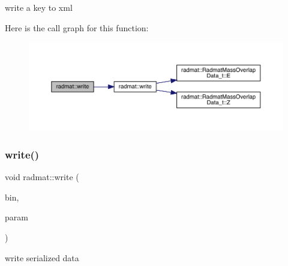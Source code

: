 write a key to xml 

Here is the call graph for this function\+:
\nopagebreak
\begin{figure}[H]
\begin{center}
\leavevmode
\includegraphics[width=350pt]{d4/d83/namespaceradmat_adaf52a8cd9ebda9a7d68fbe9f69d20a9_cgraph}
\end{center}
\end{figure}
\mbox{\label{namespaceradmat_a47d088d360c723c8981b3ef1ed8da405}} 
\subsubsection{\texorpdfstring{write()}{write()}\hspace{0.1cm}{\footnotesize\ttfamily [3/3]}}
{\footnotesize\ttfamily void radmat\+::write (\begin{DoxyParamCaption}\item[{A\+D\+A\+T\+I\+O\+::\+Binary\+Writer \&}]{bin,  }\item[{const \mbox{\hyperlink{structradmat_1_1RadmatMassOverlapData__t}{Radmat\+Mass\+Overlap\+Data\+\_\+t}} \&}]{param }\end{DoxyParamCaption})}



write serialized data 

